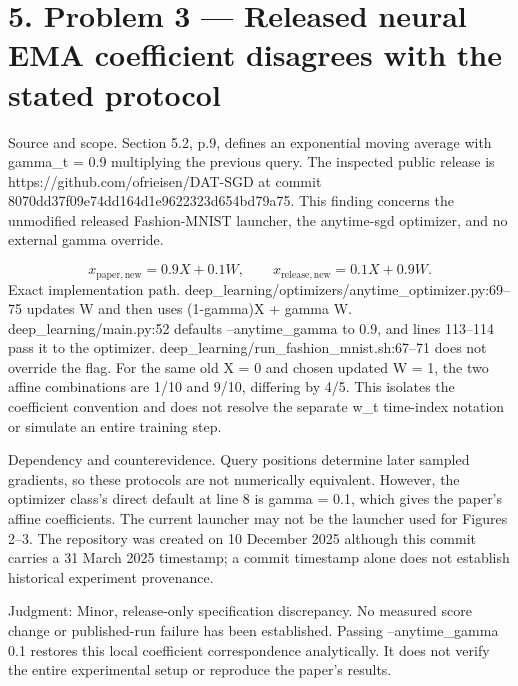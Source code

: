 \documentclass[10pt]{article}
\begin{document}
\section*{5. Problem 3 — Released neural EMA coefficient disagrees with the stated protocol}
Source and scope. Section 5.2, p.9, defines an exponential moving average with gamma\_t = 0.9 multiplying the previous query. The inspected public release is https://github.com/ofrieisen/DAT-SGD at commit 8070dd37f09e74dd164d1e9622323d654bd79a75. This finding concerns the unmodified released Fashion-MNIST launcher, the anytime-sgd optimizer, and no external gamma override.\par
\[x_{\mathrm{paper,new}}=0.9X+0.1W,\qquad
x_{\mathrm{release,new}}=0.1X+0.9W.\] Exact implementation path. deep\_learning/optimizers/anytime\_optimizer.py:69–75 updates W and then uses (1-gamma)X + gamma W. deep\_learning/main.py:52 defaults –anytime\_gamma to 0.9, and lines 113–114 pass it to the optimizer. deep\_learning/run\_fashion\_mnist.sh:67–71 does not override the flag. For the same old X = 0 and chosen updated W = 1, the two affine combinations are 1/10 and 9/10, differing by 4/5. This isolates the coefficient convention and does not resolve the separate w\_t time-index notation or simulate an entire training step.\par
Dependency and counterevidence. Query positions determine later sampled gradients, so these protocols are not numerically equivalent. However, the optimizer class’s direct default at line 8 is gamma = 0.1, which gives the paper’s affine coefficients. The current launcher may not be the launcher used for Figures 2–3. The repository was created on 10 December 2025 although this commit carries a 31 March 2025 timestamp; a commit timestamp alone does not establish historical experiment provenance.\par
Judgment: Minor, release-only specification discrepancy. No measured score change or published-run failure has been established. Passing –anytime\_gamma 0.1 restores this local coefficient correspondence analytically. It does not verify the entire experimental setup or reproduce the paper’s results.\par
\end{document}
